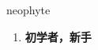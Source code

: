 
\begin{frame}
{\huge neophyte}
\begin{center}
\begin{enumerate}\Large
  \item \textbf{初学者，新手}
\end{enumerate}
\end{center}
\end{frame}
